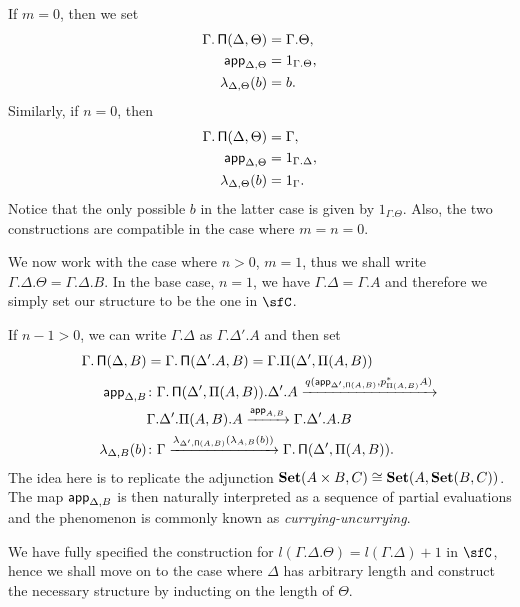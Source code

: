 \begin{construction}[Part 1]
  If $m=0$, then we set
  \begin{align*}
    \Gamma.\operatorname{\mathsf{\Pi}}(\Delta,\Theta) &=\Gamma.\Theta, \\
    \operatorname{\mathsf{app}}_{\Delta,\Theta} &=1_{\Gamma.\Theta}, \\
    \lambda_{\Delta,\Theta}(b) &=b.
  \end{align*}
  Similarly, if $n=0$, then
  \begin{align*}
    \Gamma.\operatorname{\mathsf{\Pi}}(\Delta,\Theta) &=\Gamma, \\
    \operatorname{\mathsf{app}}_{\Delta,\Theta} &=1_{\Gamma.\Delta}, \\
    \lambda_{\Delta,\Theta}(b) &=1_\Gamma.
  \end{align*}
  Notice that the only possible $b$ in the latter case is given by
  $1_{\Gamma.\Theta}$. Also, the two constructions are compatible in the case
  where $m=n=0$.

  We now work with the case where $n>0$, $m=1$, thus we shall write
  $\Gamma.\Delta.\Theta=\Gamma.\Delta.B$. In the base case, $n=1$, we have
  $\Gamma.\Delta=\Gamma.A$ and therefore we simply set our structure to be the
  one in $\sfC$.

  If $n-1>0$, we can write
  $\Gamma.\Delta$ as $\Gamma.\Delta'.A$ and then set
  \begin{align*}
    \Gamma.\operatorname{\mathsf{\Pi}}(\Delta,B)
    &=\Gamma.\operatorname{\mathsf{\Pi}}(\Delta'.A,B)=\Gamma.\Pi(\Delta',\Pi(A,B)) \\
    \operatorname{\mathsf{app}}_{\Delta,B} 
    &\colon
    \Gamma.\operatorname{\mathsf{\Pi}}(\Delta',\Pi(A,B)).\Delta'.A
                    \xrightarrow{q(\operatorname{\mathsf{app}}_{\Delta',\operatorname{\mathsf{\Pi}}(A,B)},p^*_{\Pi(A,B)}A)} \\
                    &\Gamma.\Delta'.\Pi(A,B).A
                    \xrightarrow{\operatorname{\mathsf{app}}_{A,B}}\Gamma.\Delta'.A.B \\
    \lambda_{\Delta,B}(b)
    &\colon
    \Gamma
    \xrightarrow{\lambda_{\Delta',\operatorname{\mathsf{\Pi}}(A,B)}(\lambda_{A,B}(b))}
    \Gamma.\operatorname{\mathsf{\Pi}}(\Delta',\Pi(A,B)).
  \end{align*}
  The idea here is to replicate the adjunction $\operatorname{\mathbf{Set}}(A\times
  B,C)\cong\operatorname{\mathbf{Set}}(A,\operatorname{\mathbf{Set}}(B,C))$. The map $\operatorname{\mathsf{app}}_{\Delta,B}$ is then naturally
  interpreted as a sequence of partial evaluations and the phenomenon is
  commonly known as \emph{currying-uncurrying}.

\end{construction}

  We have fully specified the construction for
  $l(\Gamma.\Delta.\Theta)=l(\Gamma.\Delta)+1$ in $\sfC$, hence we shall move on
  to the case where $\Delta$ has arbitrary length and construct the necessary
  structure by inducting on the length of $\Theta$.

